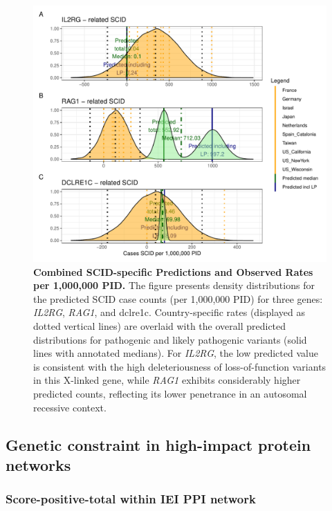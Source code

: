 \begin{figure}[ht]
  \centering
  \includegraphics[width=.75\textwidth]{../images/validation_studies_scid_combined_plot.pdf}
  \caption{\textbf{Combined SCID-specific Predictions and Observed Rates per 1,000,000 PID.}
    The figure presents density distributions for the predicted SCID case counts (per 1,000,000 PID) for three genes: \textit{IL2RG}, \textit{RAG1}, and \ac{dclre1c}. Country-specific rates (displayed as dotted vertical lines) are overlaid with the overall predicted distributions for pathogenic and likely pathogenic variants (solid lines with annotated medians). For \textit{IL2RG}, the low predicted value is consistent with the high deleteriousness of loss-of-function variants in this X-linked gene, while \textit{RAG1} exhibits considerably higher predicted counts, reflecting its lower penetrance in an autosomal recessive context.}
  \label{fig:scid_combined}
\end{figure}


\FloatBarrier
\clearpage
\subsection{Genetic constraint in high-impact protein networks}
\subsubsection{Score-positive-total within IEI PPI network}

